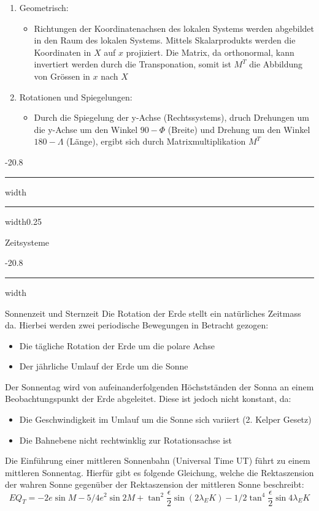 \documentclass[9pt, landscape, fleqn]{scrartcl}
\makeatletter
\renewcommand{\subsection}{\@startsection{subsection}{1}{0mm}%
{-2\baselineskip}{0.8\baselineskip}%
{\hrule depth 0.2pt width\columnwidth\hrule depth0.75pt
width0.25\columnwidth\vspace*{1.2em}\large\bfseries\rmfamily}}
\renewcommand{\subsubsection}{\@startsection{subsubsection}{1}{0mm}%
{-2\baselineskip}{0.8\baselineskip}%
{\hrule depth 0.2pt width\columnwidth\vspace*{1.2em}\normalsize\bfseries\rmfamily}}
\makeatother
\begin{document}
\begin{multicols*}{3}
\begin{enumerate}
    \item Geometrisch: \begin{itemize}
        \item Richtungen der Koordinatenachsen des lokalen Systems werden abgebildet in den Raum des lokalen Systems. Mittels Skalarprodukts werden die Koordinaten in $X$ auf $x$ projiziert. Die Matrix, da orthonormal, kann invertiert werden durch die Transponation, somit ist $M^T$ die Abbildung von Grössen in $x$ nach $X$
    \end{itemize}
    \item Rotationen und Spiegelungen: \begin{itemize}
        \item Durch die Spiegelung der y-Achse (Rechtssystems), druch Drehungen um die y-Achse um den Winkel $90-\Phi$ (Breite) und Drehung um den Winkel $180-\Lambda$ (Länge), ergibt sich durch Matrixmultiplikation $M^T$ 
    \end{itemize}
\end{enumerate}

\subsection{Zeitsysteme}

\subsubsection{Sonnenzeit und Sternzeit}
Die Rotation der Erde stellt ein natürliches Zeitmass da. Hierbei werden zwei periodische Bewegungen in Betracht gezogen:
\begin{itemize}
    \item Die tägliche Rotation der Erde um die polare Achse
    \item Der jährliche Umlauf der Erde um die Sonne
\end{itemize}

Der Sonnentag wird von aufeinanderfolgenden Höchstständen der Sonna an einem Beobachtungspunkt der Erde abgeleitet. Diese ist jedoch nicht konstant, da:
\begin{itemize}
    \item Die Geschwindigkeit im Umlauf um die Sonne sich variiert (2. Kelper Gesetz)
    \item Die Bahnebene nicht rechtwinklig zur Rotationsachse ist
\end{itemize}

Die Einführung einer mittleren Sonnenbahn (Universal Time UT) führt zu einem mittleren Sonnentag. Hierfür gibt es folgende Gleichung, welche die Rektaszension der wahren Sonne gegenüber der Rektaszension der mittleren Sonne beschreibt:
\begin{equation*}
    EQ_T = -2 e \sin M - 5/4 e^2 \sin 2M + \tan^2 \frac{\epsilon}{2} \sin(2\lambda_EK) - 1/2 \tan^4 \frac{\epsilon}{2} \sin 4\lambda_EK
\end{equation*}


\end{multicols*}
\end{document}
